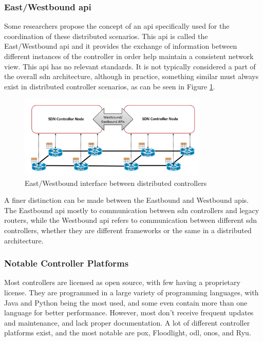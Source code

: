 \subsubsection[East/Westbound API]{East/Westbound \gls{api}}
Some researchers propose the concept of an \gls{api} specifically used for the coordination of these distributed scenarios\cite{kreutz_software-defined_2015}\cite{xia_survey_2015}\cite{thyagaturu_software_2016}\cite{latif_comprehensive_2020}\cite{zhu_sdn_2020}. This \gls{api} is called the East/Westbound \gls{api} and it provides the exchange of information between different instances of the controller in order help maintain a consistent network view. This \gls{api} has no relevant standards. It is not typically considered a part of the overall \gls{sdn} architecture, although in practice, something similar must always exist in distributed controller scenarios, as can be seen in Figure \ref{fig:east_west}.

\begin{figure}
	\centering
	\includegraphics[width=0.8\textwidth]{Chapters/Figures/SDNs/east_west_api.png}
	\caption{East/Westbound interface between distributed controllers\cite{kreutz_software-defined_2015}}
	\label{fig:east_west}
\end{figure}


A finer distinction can be made between the Eastbound and Westbound \glspl{api}\cite{kreutz_software-defined_2015}. The Eastbound \gls{api} mostly to communication between \gls{sdn} controllers and legacy routers, while the Westbound \gls{api} refers to communication between different \gls{sdn} controllers, whether they are different frameworks or the same in a distributed architecture. 


\subsubsection{Notable Controller Platforms}
Most controllers are licensed as open source, with few having a proprietary license. They are programmed in a large variety of programming languages, with Java and Python being the most used, and some even contain more than one language for better performance. However, most don't receive frequent updates and maintenance, and lack proper documentation\cite{zhu_sdn_2020}. A lot of different controller platforms exist, and the most notable are \gls{pox}, Floodlight, \gls{odl}, \gls{onos}, and Ryu. 

